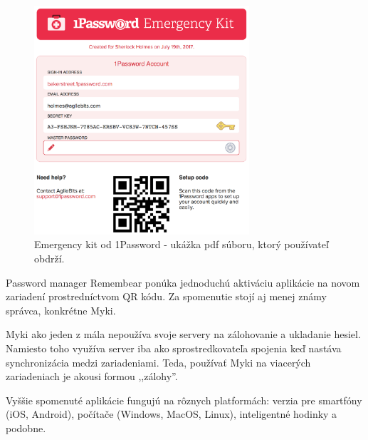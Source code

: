 \begin{figure}[ht]
  \centering
  \includegraphics[width=8cm]{img/1pass.png}
  \caption{Emergency kit od 1Password - ukážka pdf súboru, ktorý používateľ obdrží.}
\end{figure}

\par Password manager Remembear ponúka jednoduchú aktiváciu aplikácie na novom zariadení prostredníctvom QR kódu. Za spomenutie stojí aj menej známy správca, konkrétne Myki. \par Myki ako jeden z mála nepoužíva svoje servery na zálohovanie a ukladanie hesiel. Namiesto toho využíva server iba ako sprostredkovateľa \cite{18} spojenia keď nastáva synchronizácia medzi zariadeniami. Teda, používať Myki na viacerých zariadeniach je akousi formou ,,zálohy''.
\par Vyššie spomenuté aplikácie fungujú na rôznych platformách: verzia pre smartfóny (iOS, Android), počítače (Windows, MacOS, Linux), inteligentné hodinky a podobne.